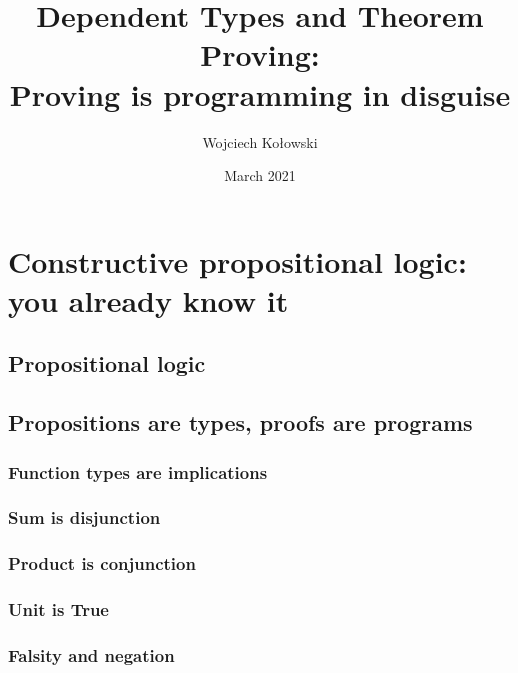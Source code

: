 \documentclass{beamer}
\title{Dependent Types and Theorem Proving: \\Proving is programming in disguise}
\author{Wojciech Kołowski}
\date{March 2021}
\begin{document}
\frame{\titlepage}
\frame{\tableofcontents}

\section{Constructive propositional logic: you already know it}

\subsection{Propositional logic}

\subsection{Propositions are types, proofs are programs}

\subsubsection{Function types are implications}
\subsubsection{Sum is disjunction}
\subsubsection{Product is conjunction}
\subsubsection{Unit is True}

\subsubsection{Falsity and negation}


\end{document}
